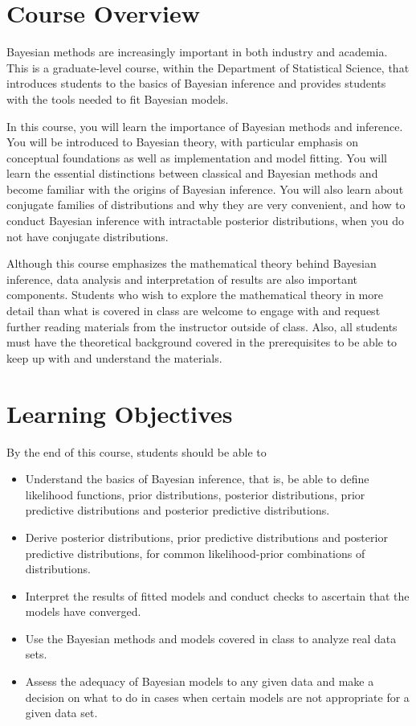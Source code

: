 \documentclass[11pt, a4paper]{article}
\begin{document}
\vspace{.5cm}
\setlength{\unitlength}{1in}
\renewcommand{\arraystretch}{1.5}



\section{Course Overview}
Bayesian methods are increasingly important in both industry and academia. This is a graduate-level course, within the Department of Statistical Science, that introduces students to the basics of Bayesian inference and provides students with the tools needed to fit Bayesian models. 

In this course, you will learn the importance of Bayesian methods and inference. You will be introduced to Bayesian theory, with particular emphasis on conceptual foundations as well as implementation and model fitting. You will learn the essential distinctions between classical and Bayesian methods and become familiar with the origins of Bayesian inference. You will also learn about conjugate families of distributions and why they are very convenient, and how to conduct Bayesian inference with intractable posterior distributions,  when you do not have conjugate distributions.

Although this course emphasizes the mathematical theory behind Bayesian inference, data analysis and interpretation of results are also important components. Students who wish to explore the mathematical theory in more detail than what is covered in class are welcome to engage with and request further reading materials from the instructor outside of class. Also, all students must have the theoretical background covered in the prerequisites to be able to keep up with and understand the materials. 

\section{Learning Objectives}
By the end of this course, students should be able to
\begin{itemize}[label= {\color{darkblue}{\ArrowBoldRightStrobe}}]
	\item Understand the basics of Bayesian inference, that is, be able to define likelihood functions, prior distributions, posterior distributions, prior predictive distributions and posterior predictive distributions.
	\item Derive posterior distributions, prior predictive distributions and posterior predictive distributions, for common likelihood-prior combinations of distributions.
	\item Interpret the results of fitted models and conduct checks to ascertain that the models have converged.
	\item Use the Bayesian methods and models covered in class to analyze real data sets.
	\item Assess the adequacy of Bayesian models to any given data and make a decision on what to do in cases when certain models are not appropriate for a given data set.
\end{itemize}
\end{document}

